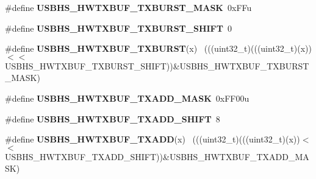 \begin{DoxyCompactItemize}
\item 
\hypertarget{group___u_s_b_h_s___register___masks_gade70e69adc587f5be3689a1c7135a781}{}\#define {\bfseries U\+S\+B\+H\+S\+\_\+\+H\+W\+T\+X\+B\+U\+F\+\_\+\+T\+X\+B\+U\+R\+S\+T\+\_\+\+M\+A\+S\+K}~0x\+F\+Fu\label{group___u_s_b_h_s___register___masks_gade70e69adc587f5be3689a1c7135a781}

\item 
\hypertarget{group___u_s_b_h_s___register___masks_ga72e68cfb99f8cb0379faf2e374bdae6f}{}\#define {\bfseries U\+S\+B\+H\+S\+\_\+\+H\+W\+T\+X\+B\+U\+F\+\_\+\+T\+X\+B\+U\+R\+S\+T\+\_\+\+S\+H\+I\+F\+T}~0\label{group___u_s_b_h_s___register___masks_ga72e68cfb99f8cb0379faf2e374bdae6f}

\item 
\hypertarget{group___u_s_b_h_s___register___masks_gabe569580d4f44e84c805c21b99aa8b27}{}\#define {\bfseries U\+S\+B\+H\+S\+\_\+\+H\+W\+T\+X\+B\+U\+F\+\_\+\+T\+X\+B\+U\+R\+S\+T}(x)                              ~(((uint32\+\_\+t)(((uint32\+\_\+t)(x))$<$$<$U\+S\+B\+H\+S\+\_\+\+H\+W\+T\+X\+B\+U\+F\+\_\+\+T\+X\+B\+U\+R\+S\+T\+\_\+\+S\+H\+I\+F\+T))\&U\+S\+B\+H\+S\+\_\+\+H\+W\+T\+X\+B\+U\+F\+\_\+\+T\+X\+B\+U\+R\+S\+T\+\_\+\+M\+A\+S\+K)\label{group___u_s_b_h_s___register___masks_gabe569580d4f44e84c805c21b99aa8b27}

\item 
\hypertarget{group___u_s_b_h_s___register___masks_ga0f9cce7985fae39a271ef90055c5ccdc}{}\#define {\bfseries U\+S\+B\+H\+S\+\_\+\+H\+W\+T\+X\+B\+U\+F\+\_\+\+T\+X\+A\+D\+D\+\_\+\+M\+A\+S\+K}~0x\+F\+F00u\label{group___u_s_b_h_s___register___masks_ga0f9cce7985fae39a271ef90055c5ccdc}

\item 
\hypertarget{group___u_s_b_h_s___register___masks_gac52b990f5933d32b75fc162510ee62f2}{}\#define {\bfseries U\+S\+B\+H\+S\+\_\+\+H\+W\+T\+X\+B\+U\+F\+\_\+\+T\+X\+A\+D\+D\+\_\+\+S\+H\+I\+F\+T}~8\label{group___u_s_b_h_s___register___masks_gac52b990f5933d32b75fc162510ee62f2}

\item 
\hypertarget{group___u_s_b_h_s___register___masks_gaf08e7424d723e41b03d857a8b6f20bdf}{}\#define {\bfseries U\+S\+B\+H\+S\+\_\+\+H\+W\+T\+X\+B\+U\+F\+\_\+\+T\+X\+A\+D\+D}(x)                                  ~(((uint32\+\_\+t)(((uint32\+\_\+t)(x))$<$$<$U\+S\+B\+H\+S\+\_\+\+H\+W\+T\+X\+B\+U\+F\+\_\+\+T\+X\+A\+D\+D\+\_\+\+S\+H\+I\+F\+T))\&U\+S\+B\+H\+S\+\_\+\+H\+W\+T\+X\+B\+U\+F\+\_\+\+T\+X\+A\+D\+D\+\_\+\+M\+A\+S\+K)\label{group___u_s_b_h_s___register___masks_gaf08e7424d723e41b03d857a8b6f20bdf}


\end{DoxyCompactItemize}
